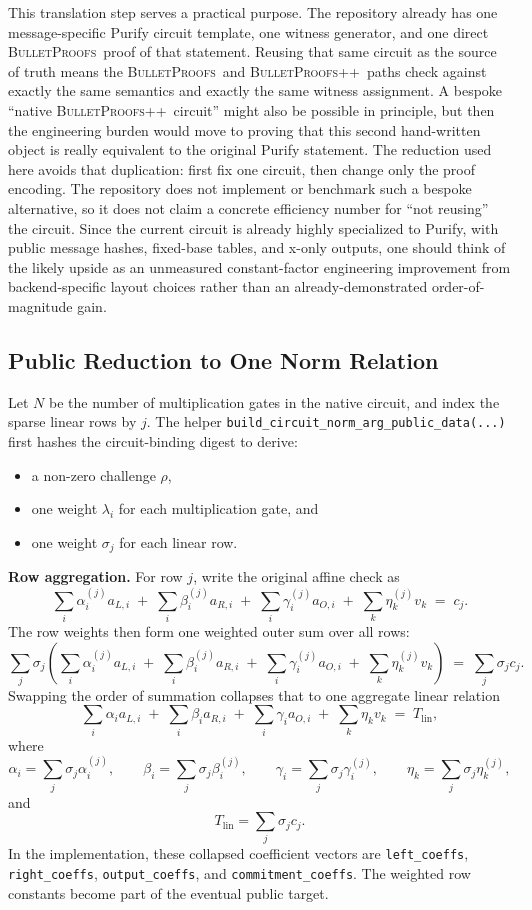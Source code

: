 \documentclass[11pt]{article}
\DeclareRobustCommand{\bp}{{\normalfont\scshape BulletProofs}}
\DeclareRobustCommand{\bppp}{{\normalfont\scshape BulletProofs++}}
\begin{document}
This translation step serves a practical purpose. The repository already has one
message-specific Purify circuit template, one witness generator, and one direct \bp\ proof of that
statement. Reusing that same circuit as the source of truth means the \bp\ and
\bppp\ paths check against exactly the same semantics and exactly the same witness assignment. A bespoke
``native \bppp\ circuit'' might also be possible in principle, but then the engineering burden would
move to proving that this second hand-written object is really equivalent to the original Purify
statement. The reduction used here avoids that duplication: first fix one circuit, then change only
the proof encoding. The repository does not implement or benchmark such a bespoke alternative, so it
does not claim a concrete efficiency number for ``not reusing'' the circuit. Since the current
circuit is already highly specialized to Purify, with public message hashes, fixed-base tables, and
x-only outputs, one should think of the likely upside as an unmeasured constant-factor engineering
improvement from backend-specific layout choices rather than an already-demonstrated order-of-
magnitude gain.

\subsection{Public Reduction to One Norm Relation}

Let $N$ be the number of multiplication gates in the native circuit, and index the sparse linear rows
by $j$. The helper
\texttt{build\_circuit\_norm\_arg\_public\_data(...)} first hashes the circuit-binding digest to
derive:
\begin{itemize}[nosep]
  \item a non-zero challenge $\rho$,
  \item one weight $\lambda_i$ for each multiplication gate, and
  \item one weight $\sigma_j$ for each linear row.
\end{itemize}

\medskip\noindent\textbf{Row aggregation.}
For row $j$, write the original affine check as
\[
\sum_i \alpha_i^{(j)} a_{L,i}
\;+\;
\sum_i \beta_i^{(j)} a_{R,i}
\;+\;
\sum_i \gamma_i^{(j)} a_{O,i}
\;+\;
\sum_k \eta_k^{(j)} v_k
\;=\;
c_j.
\]
The row weights then form one weighted outer sum over all rows:
\[
\sum_j \sigma_j
\left(
\sum_i \alpha_i^{(j)} a_{L,i}
\;+\;
\sum_i \beta_i^{(j)} a_{R,i}
\;+\;
\sum_i \gamma_i^{(j)} a_{O,i}
\;+\;
\sum_k \eta_k^{(j)} v_k
\right)
\;=\;
\sum_j \sigma_j c_j.
\]
Swapping the order of summation collapses that to one aggregate linear relation
\[
\sum_i \alpha_i a_{L,i}
\;+\;
\sum_i \beta_i a_{R,i}
\;+\;
\sum_i \gamma_i a_{O,i}
\;+\;
\sum_k \eta_k v_k
\;=\;
T_{\mathrm{lin}},
\]
where
\[
\alpha_i = \sum_j \sigma_j \alpha_i^{(j)}, \qquad
\beta_i = \sum_j \sigma_j \beta_i^{(j)}, \qquad
\gamma_i = \sum_j \sigma_j \gamma_i^{(j)}, \qquad
\eta_k = \sum_j \sigma_j \eta_k^{(j)},
\]
and
\[
T_{\mathrm{lin}} = \sum_j \sigma_j c_j.
\]
In the implementation, these collapsed coefficient vectors are
\texttt{left\_coeffs}, \texttt{right\_coeffs}, \texttt{output\_coeffs}, and
\texttt{commitment\_coeffs}. The weighted row constants become part of the eventual public target.
\end{document}
